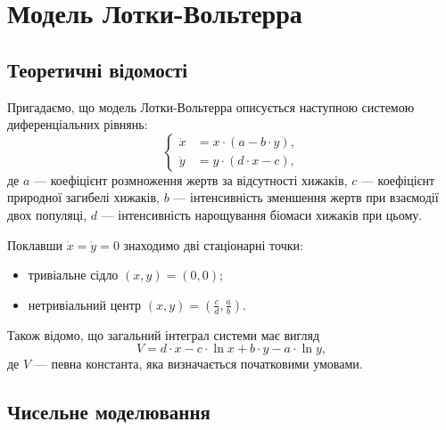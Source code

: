 




\tableofcontents

\section{Модель Лотки-Вольтерра}

\subsection{Теоретичні відомості}

Пригадаємо, що модель Лотки-Вольтерра описується наступною системою диференціальних рівнянь:
\begin{equation}
	\left\{
		\begin{aligned}
			\dot x &= x \cdot (a - b \cdot y), \\
			\dot y &= y \cdot (d \cdot x - c),
		\end{aligned}
	\right.
\end{equation}
де $a$ --- коефіцієнт розмноження жертв за відсутності хижаків, $c$ --- коефіцієнт природної загибелі хижаків, $b$ --- інтенсивність зменшення жертв при взаємодії двох популяці, $d$ --- інтенсивність нарощування біомаси хижаків при цьому. \medskip

Поклавши $\dot x = \dot y = 0$ знаходимо дві стаціонарні точки: 
\begin{itemize}
	\item тривіальне сідло $(x, y) = (0, 0)$;
	\item нетривіальний центр $(x, y) = \left(\frac{c}{d}, \frac{a}{b}\right)$.
\end{itemize}

Також відомо, що загальний інтеграл системи має вигляд
\begin{equation}
	V = d \cdot x - c \cdot \ln x + b \cdot y - a \cdot \ln y,
\end{equation}
де $V$ --- певна константа, яка визначається початковими умовами.

\subsection{Чисельне моделювання}

